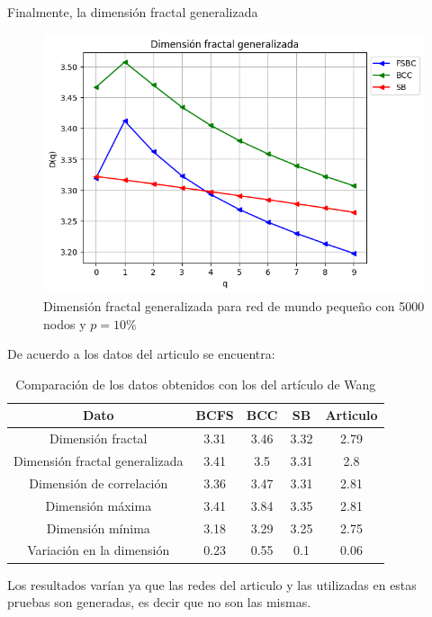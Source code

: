 Finalmente, la dimensión fractal generalizada
\begin{figure}[H]
    \centering
    \includegraphics[scale=0.7]{Capitulo4Multifractalidad/imagenes/a_DqsmallWorld4000p10.png}
    \caption{Dimensión fractal generalizada para red de mundo pequeño con 5000 nodos y $p=10\%$}
\end{figure}

De acuerdo a los datos del articulo se encuentra:
\begin{table}[H]
    \centering
    \begin{tabular}{|c|c|c|c|c|}
        \hline
         \textbf{Dato}& \textbf{BCFS} & \textbf{BCC} & \textbf{SB} & \textbf{Articulo} \\
         \hline
         Dimensión fractal &3.31 & 3.46 & 3.32 & 2.79 \\
         \hline
         Dimensión fractal generalizada & 3.41 & 3.5 & 3.31 &2.8  \\
         \hline
         Dimensión de correlación & 3.36 & 3.47 & 3.31 &2.81 \\
         \hline
         Dimensión máxima & 3.41 & 3.84 & 3.35 &2.81 \\
         \hline
         Dimensión mínima & 3.18 & 3.29 & 3.25 &2.75 \\
         \hline
         Variación en la dimensión & 0.23 & 0.55 & 0.1 &0.06 \\
         \hline
    \end{tabular}
    \caption{Comparación de los datos obtenidos con los del artículo de Wang\cite{Wang2012}}
\end{table}

Los resultados varían ya que las redes del articulo y las utilizadas en estas pruebas son generadas, es decir que no son las mismas.

